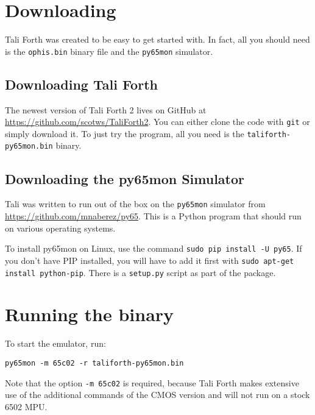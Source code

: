 \section{Downloading}

Tali Forth was created to be easy to get started with. In fact, all you should
need is the \texttt{ophis.bin} binary file and the
\texttt{py65mon} simulator.

\subsection{Downloading Tali Forth}

The newest version of Tali Forth 2 lives on GitHub at
\href{https://github.com/scotws/TaliForth2}{https://github.com/scotws/TaliForth2}.
You can either clone the code with \texttt{git} or
simply download it. To just try the program, all you need is the
\texttt{taliforth-py65mon.bin} binary. 

\subsection{Downloading the py65mon Simulator}

Tali was written to run out of the box on the 
\texttt{py65mon} simulator from
\href{https://github.com/mnaberez/py65}{https://github.com/mnaberez/py65}. This
is a Python program that should run on various operating systems. 

To install py65mon on Linux, use the command \texttt{sudo pip
install -U py65}. If you don't have PIP installed, you will have to
add it first with \texttt{sudo apt-get install python-pip}.  There is a
\texttt{setup.py} script as part of the package.

\section{Running the binary}

To start the emulator, run:
\begin{lstlisting}[frame=lines]
        py65mon -m 65c02 -r taliforth-py65mon.bin
\end{lstlisting}

\noindent Note that the option \texttt{-m 65c02} is required, because Tali Forth
makes extensive use of the additional commands of the CMOS version and will not
run on a stock 6502 MPU.

